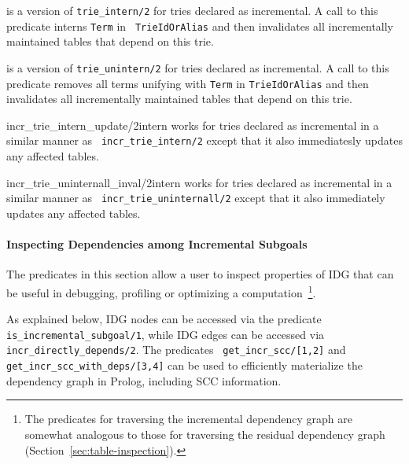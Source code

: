 \begin{description}
%
is a version of {\tt trie\_intern/2} for tries declared as
incremental.  A call to this predicate interns {\tt Term} in {\tt
  TrieIdOrAlias} and then invalidates all incrementally maintained
tables that depend on this trie.

%
is a version of {\tt trie\_unintern/2} for tries declared as
incremental.  A call to this predicate removes all terms unifying with
{\tt Term} in {\tt TrieIdOrAlias} and then invalidates all
incrementally maintained tables that depend on this trie.

           {incr\_trie\_intern\_update/2}{intern}
%
works for tries declared as incremental in a similar manner as {\tt
  incr\_trie\_intern/2} except that it also immediatesly updates any
affected tables.

{incr\_trie\_uninternall\_inval/2}{intern}
%
works for tries declared as incremental in a similar manner as {\tt
  incr\_trie\_uninternall/2} except that it also immediately updates
any affected tables.
\end{description}

\paragraph{Inspecting Dependencies among Incremental Subgoals}
%
The predicates in this section allow a user to inspect properties of
IDG that can be useful in debugging, profiling or optimizing a
computation~\footnote{The predicates for traversing the incremental
  dependency graph are somewhat analogous to those for traversing the
  residual dependency graph (Section~\ref{sec:table-inspection}).}.

As explained below, IDG nodes can be accessed via the predicate {\tt
  is\_incremental\_subgoal/1}, while IDG edges can be accessed via
{\tt incr\_directly\_depends/2}.  The predicates {\tt
  get\_incr\_scc/[1,2]} and {\tt get\_incr\_scc\_with\_deps/[3,4]} can
be used to efficiently materialize the dependency graph in Prolog,
including SCC information.

